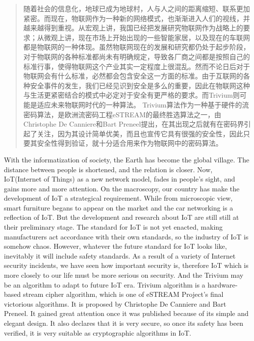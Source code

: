 
\begin{abstract}
\thispagestyle{blank}

随着社会的信息化，地球已成为地球村，人与人之间的距离缩短、联系更加紧密。而现在，物联网作为一种新的网络模式，也渐渐进入人们的视线，并越来越得到重视。从宏观上讲，我国已经把发展研究物联网作为战略上的要求；从微观上讲，现在市场上开始出现的一些智能家居，以及现在的车联网都是物联网的一种体现。虽然物联网现在的发展和研究都仍处于起步阶段，对于物联网的各种标准都尚未有明确规定，导致各厂商之间都是按照自己的标准行事，使得物联网这个产业其实一定程度上很混乱。然而不论日后对于物联网会有什么标准，必然都会包含安全这一方面的标准。由于互联网的各种安全事件的发生，我们已经见识到安全是多么的重要，因此在物联网这种与生活更紧密结合的模式中必定对于安全有更严格的要求。而Trivium则可能是适应未来物联网时代的一种算法。
Trivium算法作为一种基于硬件的流密码算法，是欧洲流密码工程eSTREAM的最终胜选算法之一，由Christophe De Canniere和Bart Preneel提出，在其出现之后就有在密码界引起了关注，因为其设计简单优美，而且也宣传它具有很强的安全性，因此只要其安全性得到验证，就十分适合用来作为物联网中的密码算法。

\end{abstract}

\begin{englishabstract}
\thispagestyle{blank}

With the informatization of society, the Earth has become the global village. The distance between people is shortened, and the relation is closer. Now, IoT(Internet of Things) as a new network model, fades in people's sight, and gains more and more attention. On the macroscopy, our country has make the development of IoT a strategical requirement. While from microscopic view, smart furniture begans to appear on the market and the car networking is a reflection of IoT. But the development and research about IoT are still still at their preliminary stage. The standard for IoT is not yet enacted, making manufacturers act accordance with their own standards, so the industry of IoT is somehow chaos. However, whatever the future standard for IoT looks like, inevitably it will include safety standards. As a result of a variety of Internet security incidents, we have seen how important security is, therefore IoT which is more closely to our life must be more serious on security. And the Trivium may be an algorithm to adapt to future IoT era.
Trivium algorithm is a hardware-based stream cipher algorithm, which is one of eSTREAM Project's final victorious algorithms. It is proposed by Christophe De Canniere and Bart Preneel. It gained great attention once it was published because of its simple and elegant design. It also declares that it is very secure, so once its safety has been verified, it is very suitable as cryptographic algorithms in IoT.

\end{englishabstract}

